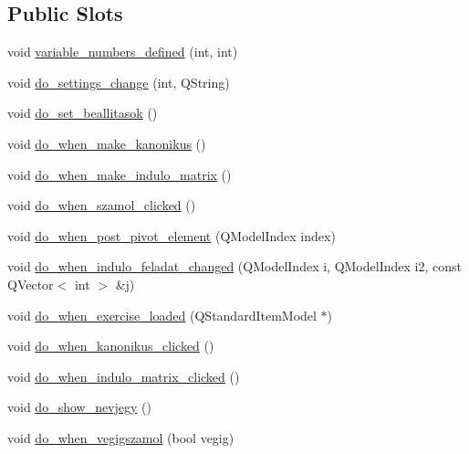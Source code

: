 \subsection*{Public Slots}
\begin{DoxyCompactItemize}
\item 
void \hyperlink{classSimplex__method__calculator_ae8f41cf2c4b813322d238b3f0ed5d415}{variable\+\_\+numbers\+\_\+defined} (int, int)
\item 
void \hyperlink{classSimplex__method__calculator_a3f71df14afb7d06f4ed6c1d403d44fcd}{do\+\_\+settings\+\_\+change} (int, Q\+String)
\item 
void \hyperlink{classSimplex__method__calculator_a1a29425a6f5d789cfd1f2f752e017a17}{do\+\_\+set\+\_\+beallitasok} ()
\item 
void \hyperlink{classSimplex__method__calculator_a8455d20c883cc45b0c536da0dbe42405}{do\+\_\+when\+\_\+make\+\_\+kanonikus} ()
\item 
void \hyperlink{classSimplex__method__calculator_a1382f7059e04318ab470943eafc9ea91}{do\+\_\+when\+\_\+make\+\_\+indulo\+\_\+matrix} ()
\item 
void \hyperlink{classSimplex__method__calculator_aac8e0f77b94815c04834b226637b0d6a}{do\+\_\+when\+\_\+szamol\+\_\+clicked} ()
\item 
void \hyperlink{classSimplex__method__calculator_aea11e77d951c1d5f5e09d366d0d0a556}{do\+\_\+when\+\_\+post\+\_\+pivot\+\_\+element} (Q\+Model\+Index index)
\item 
void \hyperlink{classSimplex__method__calculator_a706085a8cbc9e0a452da0cd2807c5ea4}{do\+\_\+when\+\_\+indulo\+\_\+feladat\+\_\+changed} (Q\+Model\+Index i, Q\+Model\+Index i2, const Q\+Vector$<$ int $>$ \&j)
\item 
void \hyperlink{classSimplex__method__calculator_a60dca1c8d54ea44325bbefad572d01a2}{do\+\_\+when\+\_\+exercise\+\_\+loaded} (Q\+Standard\+Item\+Model $\ast$)
\item 
void \hyperlink{classSimplex__method__calculator_a249c2881a8b5853cdc8b53d74dbae50d}{do\+\_\+when\+\_\+kanonikus\+\_\+clicked} ()
\item 
void \hyperlink{classSimplex__method__calculator_ae675adcf3b8b5104430cb65f2e13f729}{do\+\_\+when\+\_\+indulo\+\_\+matrix\+\_\+clicked} ()
\item 
void \hyperlink{classSimplex__method__calculator_a6c4492e8a18bc5abefba6f0f9eb2ecba}{do\+\_\+show\+\_\+nevjegy} ()
\item 
void \hyperlink{classSimplex__method__calculator_aa87a06777c60b6c3b9b78df37da2b648}{do\+\_\+when\+\_\+vegigszamol} (bool vegig)
\end{DoxyCompactItemize}

